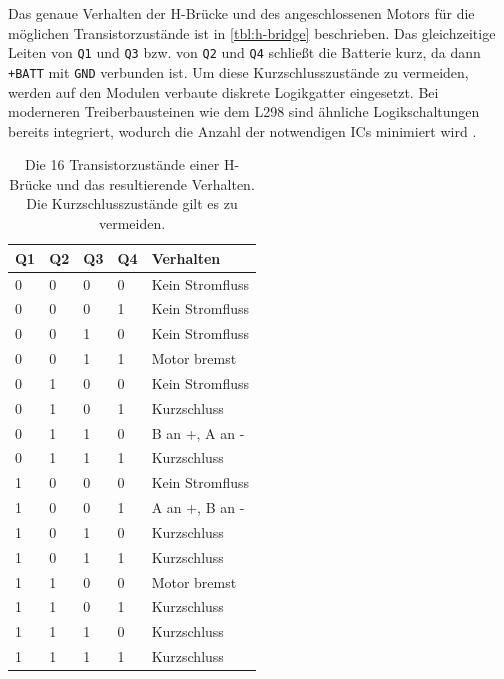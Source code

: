\documentclass[german]{thesis_KBS}
\newcommand{\code}[1]{\texttt{#1}}  %
\begin{document}
Das genaue Verhalten der H-Brücke und des angeschlossenen Motors für die
möglichen Transistorzustände ist in \autoref{tbl:h-bridge} beschrieben. Das
gleichzeitige Leiten von \code{Q1} und \code{Q3} bzw. von \code{Q2} und
\code{Q4} schließt die Batterie kurz, da dann \code{+BATT} mit \code{GND}
verbunden ist. Um diese Kurzschlusszustände zu vermeiden, werden auf den Modulen
verbaute diskrete Logikgatter eingesetzt. Bei moderneren Treiberbausteinen wie
dem L298 sind ähnliche Logikschaltungen bereits integriert, wodurch die Anzahl der notwendigen ICs minimiert wird \cite{l298-datasheet}.

\begin{table}%
    \centering
    \begin{tabular}{|l|l|l|l|l|}
        Q1  & Q2  & Q3  & Q4  & Verhalten \\ \hline
        0   & 0   & 0   & 0   & Kein Stromfluss \\
        0   & 0   & 0   & 1   & Kein Stromfluss \\
        0   & 0   & 1   & 0   & Kein Stromfluss \\
        0   & 0   & 1   & 1   & Motor bremst \\
        0   & 1   & 0   & 0   & Kein Stromfluss \\
        0   & 1   & 0   & 1   & Kurzschluss \\
        0   & 1   & 1   & 0   & B an +, A an - \\
        0   & 1   & 1   & 1   & Kurzschluss \\
        1   & 0   & 0   & 0   & Kein Stromfluss \\
        1   & 0   & 0   & 1   & A an +, B an - \\
        1   & 0   & 1   & 0   & Kurzschluss \\
        1   & 0   & 1   & 1   & Kurzschluss \\
        1   & 1   & 0   & 0   & Motor bremst \\
        1   & 1   & 0   & 1   & Kurzschluss \\
        1   & 1   & 1   & 0   & Kurzschluss \\
        1   & 1   & 1   & 1   & Kurzschluss \\
    \end{tabular}
    \caption{
        Die 16 Transistorzustände einer H-Brücke und das resultierende
        Verhalten. Die Kurzschlusszustände gilt es zu vermeiden.
    }
    \label{tbl:h-bridge}
\end{table}
\end{document}
